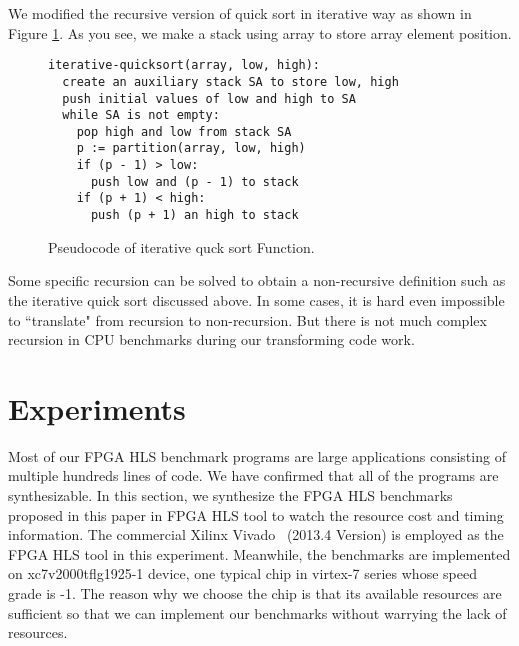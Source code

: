 \documentclass[conference]{IEEEtran}
\begin{document}
We modified the recursive version of quick sort in iterative way as shown in Figure \ref{figure_qsort_iterative}. As you see, we make a stack using array to store array element position.

\begin{figure}[h]\centering
{\fontsize{8}{8}\selectfont
\begin{lstlisting}[frame=lines]
iterative-quicksort(array, low, high):
  create an auxiliary stack SA to store low, high
  push initial values of low and high to SA
  while SA is not empty:
    pop high and low from stack SA
    p := partition(array, low, high)
    if (p - 1) > low:
      push low and (p - 1) to stack
    if (p + 1) < high:
      push (p + 1) an high to stack
\end{lstlisting}
}
\caption{Pseudocode of iterative quck sort Function.}\label{figure_qsort_iterative}
\end{figure}

Some specific recursion can be solved to obtain a non-recursive definition such as the iterative quick sort discussed above. In some cases, it is hard even impossible to ``translate" from recursion to non-recursion. But there is not much complex recursion in CPU benchmarks during our transforming code work.
%
%
%

\section{Experiments}\label{section_experiment}
Most of our FPGA HLS benchmark programs are large applications consisting of multiple hundreds lines of code. We have confirmed that all of the programs are synthesizable. In this section, we synthesize the FPGA HLS benchmarks proposed in this paper in FPGA HLS tool to watch the resource cost and timing information. The commercial Xilinx Vivado~\cite{feist2012vivado} (2013.4 Version) is employed as the FPGA HLS tool in this experiment. Meanwhile, the benchmarks are implemented on xc7v2000tflg1925-1 device, one typical chip in virtex-7 series whose speed grade is -1. The reason why we choose the chip is that its available resources are sufficient so that we can implement our benchmarks without warrying the lack of resources.
\end{document}
